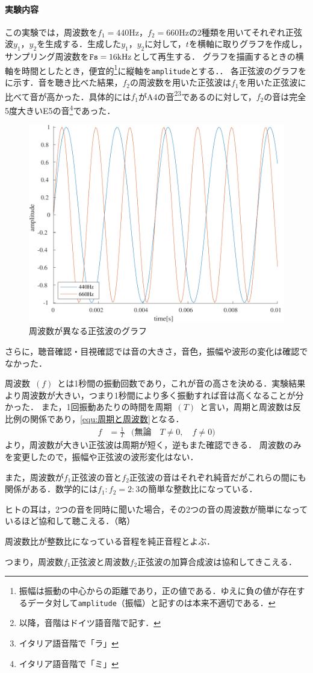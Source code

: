 \paragraph{実験内容}この実験では，周波数を\(f_1=440\textrm{Hz}\)，\(f_2=660\textrm{Hz}\)の2種類を用いてそれぞれ正弦波\(y_1\)，\(y_2\)を生成する．生成した\(y_1\)，\(y_2\)に対して，\(t\)を横軸に取りグラフを作成し，サンプリング周波数を\(\textrm{\texttt{Fs}}=16\textrm{kHz}\)として再生する．
グラフを描画するときの横軸を時間としたとき，便宜的\footnote{振幅は振動の中心からの距離であり，正の値である．ゆえに負の値が存在するデータ対して\texttt{amplitude}（振幅）と記すのは本来不適切である．}に縦軸を\texttt{amplitude}とする．\scall{}．
\result
各正弦波のグラフをに示す．音を聴き比べた結果，\(f_2\)の周波数を用いた正弦波は\(f_1\)を用いた正弦波に比べて音が高かった．具体的には\(f_1\)がA4の音\footnote{以降，音階はドイツ語音階で記す．}\footnote{イタリア語音階で「ラ」}であるのに対して，\(f_2\)の音は完全5度大きいE5の音\footnote{イタリア語音階で「ミ」}であった．
\begin{figure}
    \includegraphics[keepaspectratio,width=.3\textwidth]{../../Figures/01_01.pdf}
    \caption{周波数が異なる正弦波のグラフ}
    \label{fig:\kadaiaa}
\end{figure}
さらに，聴音確認・目視確認では音の大きさ，音色，振幅や波形の変化は確認でなかった．\par
\consideration 周波数\ \((f)\)\ とは1秒間の振動回数であり，これが音の高さを決める．実験結果より周波数が大きい，つまり1秒間により多く振動すれば音は高くなることが分かった．
また，1回振動あたりの時間を周期\ \((T)\)\ と言い，周期と周波数は反比例の関係であり，\eqref{equ:周期と周波数}となる．
\begin{align}
    f & =\frac{1}{T} & \big(\textrm{無論}\quad T\neq 0,\quad f\neq 0\big)\label{equ:周期と周波数}
\end{align}
より，周波数が大きい正弦波は周期が短く，逆もまた確認できる．
周波数のみを変更したので，振幅や正弦波の波形変化はない．\par
また，周波数が\(f_1\)正弦波の音と\(f_2\)正弦波の音はそれぞれ純音だがこれらの間にも関係がある．数学的には\(f_1:f_2=2:3\)の簡単な整数比になっている．
\begin{leftbar}
    ヒトの耳は，2つの音を同時に聞いた場合，その2つの音の周波数が簡単になっているほど協和して聴こえる．（略）\par
    周波数比が整数比になっている音程を純正音程とよぶ．\hfill{\cite[p.46\ -\ p.47]{音響工学理論基礎}}
\end{leftbar}
つまり，周波数\(f_1\)正弦波と周波数\(f_2\)正弦波の加算合成波は協和してきこえる．
